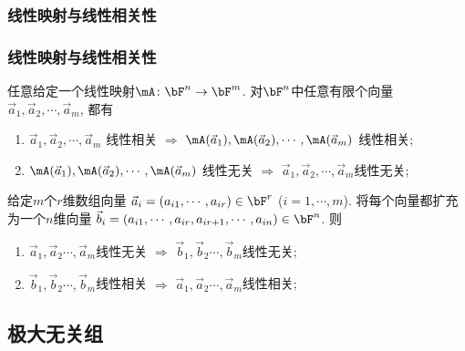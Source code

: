 \subsubsection{线性映射与线性相关性}
\begin{frame}\frametitle{线性映射与线性相关性}

\begin{proposition}
任意给定一个线性映射$\mA\colon \bF^n \rightarrow \bF^m$. 对$\bF^n$中任意有限个向量 $\vec{a}_1, \vec{a}_2, \cdots, \vec{a}_m$, \pp 都有
\begin{enumerate}
\item $\vec{a}_1,\vec{a}_2,\cdots,\vec{a}_m$ 线性相关 $\Rightarrow$ $\mA(\vec{a}_1),\mA(\vec{a}_2),\cdots,\mA(\vec{a}_m)$ 线性相关;
\item $\mA(\vec{a}_1),\mA(\vec{a}_2),\cdots,\mA(\vec{a}_m)$ 线性无关 $\Rightarrow$  $\vec{a}_1,\vec{a}_2,\cdots,\vec{a}_m$线性无关;
\pp
\end{enumerate}


\end{proposition}
\pp
\begin{example}[投影]
给定$m$个$r$维数组向量 $\vec{a}_i=(a_{i1},\cdots,a_{ir})\in \bF^r$ ($i=1,\cdots,m$). 将每个向量都扩充为一个$n$维向量 $\vec{b}_i = (a_{i1},\cdots,a_{ir},a_{ir+1},\cdots,a_{in})\in \bF^n$. \pp 则
\begin{enumerate}
\item $\vec{a}_1,\vec{a}_2\cdots,\vec{a}_m$线性无关 $\Rightarrow$ $\vec{b}_1,\vec{b}_2\cdots,\vec{b}_m$线性无关;
\item $\vec{b}_1,\vec{b}_2\cdots,\vec{b}_m$线性相关 $\Rightarrow$ $\vec{a}_1,\vec{a}_2\cdots,\vec{a}_m$线性相关;
\end{enumerate}
\end{example}
\end{frame}








\subsection{极大无关组}





